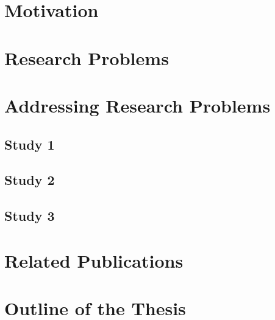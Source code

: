 \section{Motivation}

\section{Research Problems}

\section{Addressing Research Problems}
\subsection{Study 1}
\subsection{Study 2}
\subsection{Study 3}
\section{Related Publications}

\section{Outline of the Thesis}
